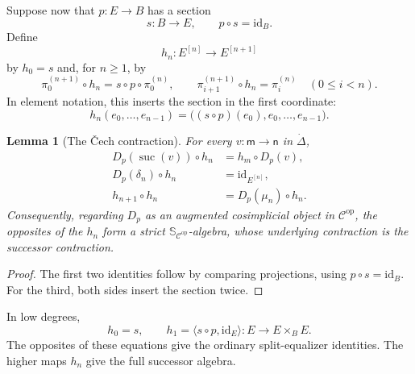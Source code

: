 \documentclass[11pt,a4paper]{article}
\numberwithin{equation}{section}
\newtheorem{lemma}[lemma]{Lemma}
\theoremstyle{definition}
\theoremstyle{remark}
\newcommand{\id}{\mathrm{id}}
\newcommand{\C}{\mathcal C}
\newcommand{\suc}{\operatorname{suc}}
\newcommand{\Smon}{\mathbb S}
\begin{document}
Suppose now that $p\colon E\to B$ has a section
\begin{equation}
  s\colon B\longrightarrow E,
  \qquad
  p\circ s=\id_B.
  \label{eq:section-of-p}
\end{equation}
Define
\begin{equation}
  h_n\colon E^{[n]}\longrightarrow E^{[n+1]}
  \label{eq:hn}
\end{equation}
by $h_0=s$ and, for $n\geq1$, by
\begin{equation}
  \pi_0^{(n+1)}\circ h_n=s\circ p\circ\pi_0^{(n)},
  \qquad
  \pi_{i+1}^{(n+1)}\circ h_n=\pi_i^{(n)}
  \quad(0\leq i<n).
  \label{eq:hn-projections}
\end{equation}
In element notation, this inserts the section in the first
coordinate:
\[
  h_n(e_0,\ldots,e_{n-1})
  =\bigl((s\circ p)(e_0),e_0,\ldots,e_{n-1}\bigr).
\]

\begin{lemma}[The \v{C}ech contraction]
\label{lem:cech-contraction}
For every $v\colon\mathsf m\to\mathsf n$ in $\dot\Delta$,
\begin{align}
  D_p(\suc(v))\circ h_n&=h_m\circ D_p(v),
  \label{eq:cech-contraction-naturality}\\
  D_p(\delta_n)\circ h_n&=\id_{E^{[n]}},
  \label{eq:cech-contraction-retraction}\\
  h_{n+1}\circ h_n&=D_p(\mu_n)\circ h_n.
  \label{eq:cech-contraction-multiplication}
\end{align}
Consequently, regarding $D_p$ as an augmented cosimplicial object in
$\C^{\mathrm{op}}$, the opposites of the $h_n$ form a strict
$\Smon_{\C^{\mathrm{op}}}$-algebra, whose underlying contraction
is the successor contraction.
\end{lemma}

\begin{proof}
The first two identities follow by comparing projections, using
$p\circ s=\id_B$. For the third, both sides insert the section twice.
\end{proof}

In low degrees,
\[
  h_0=s,
  \qquad
  h_1=\langle s\circ p,\id_E\rangle
  \colon E\to E\times_BE.
\]
The opposites of these equations give the ordinary split-equalizer
identities. The higher maps $h_n$ give the full successor algebra.
\end{document}
